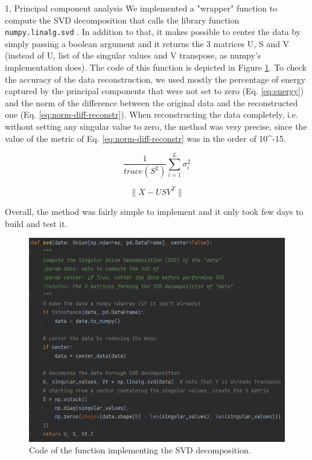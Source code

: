 \documentclass[10pt,a4paper]{article}
\begin{document}
\frontpage

\begin{task}{1, Principal component analysis}
We implemented a "wrapper" function to compute the SVD decomposition that calls the library function \texttt{numpy.linalg.svd} \cite{numpy-svd}.
In addition to that, it makes possible to center the data by simply passing a boolean argument and it returns the 3 matrices U, S and V (instead of U, list of the singular values and V transpose, as numpy's implementation does).
The code of this function is depicted in Figure \ref{fig:code-svd}.
To check the accuracy of the data reconstruction, we used mostly the percentage of energy captured by the principal components that were not set to zero (Eq. \ref{eq:energy}) and the norm of the difference between the original data and the reconstructed one (Eq. \ref{eq:norm-diff-reconstr}).
When reconstructing the data completely, i.e. without setting any singular value to zero, the method was very precise, since the value of the metric of Eq. \ref{eq:norm-diff-reconstr} was in the order of 10^{-15}.

\begin{equation}\label{eq:energy}
    \frac{1}{trace(S^2)}\sum\limits_{i=1}^L \sigma_i^2
\end{equation}

\begin{equation}\label{eq:norm-diff-reconstr}
    \|X - USV^T\|
\end{equation}

Overall, the method was fairly simple to implement and it only took few days to build and test it.

\begin{figure}[h]
    \centering
    \includegraphics[scale=0.8]{images/code_svd.png}
    \caption{Code of the function implementing the SVD decomposition.}
    \label{fig:code-svd}
\end{figure}


\end{task}
\end{document}
